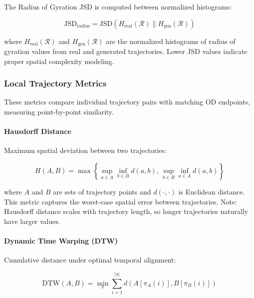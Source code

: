 The Radius of Gyration JSD is computed between normalized histograms:

\begin{equation}
\text{JSD}_{\text{radius}} = \text{JSD}(H_{\text{real}}(\mathcal{R}) \parallel H_{\text{gen}}(\mathcal{R}))
\label{eq:radius-jsd}
\end{equation}

where $H_{\text{real}}(\mathcal{R})$ and $H_{\text{gen}}(\mathcal{R})$ are the normalized histograms of radius of gyration values from real and generated trajectories. Lower JSD values indicate proper spatial complexity modeling.

\subsubsection{Local Trajectory Metrics}
\label{app:local-metrics}

These metrics compare individual trajectory pairs with matching OD endpoints, measuring point-by-point similarity.

\paragraph{Hausdorff Distance}

Maximum spatial deviation between two trajectories:

\begin{equation}
H(A, B) = \max \left\{ \sup_{a \in A} \inf_{b \in B} d(a, b), \, \sup_{b \in B} \inf_{a \in A} d(a, b) \right\}
\label{eq:hausdorff-appendix}
\end{equation}

where $A$ and $B$ are sets of trajectory points and $d(\cdot, \cdot)$ is Euclidean distance. This metric captures the worst-case spatial error between trajectories. Note: Hausdorff distance scales with trajectory length, so longer trajectories naturally have larger values.

\paragraph{Dynamic Time Warping (DTW)}

Cumulative distance under optimal temporal alignment:

\begin{equation}
\text{DTW}(A, B) = \min_{\pi} \sum_{i=1}^{|\pi|} d(A[\pi_A(i)], B[\pi_B(i)])
\label{eq:dtw-appendix}
\end{equation}

